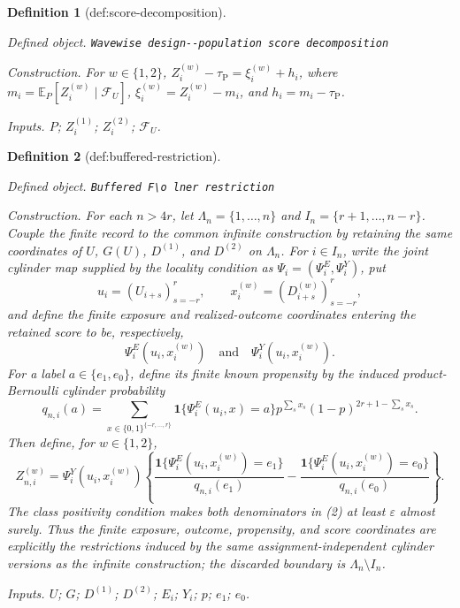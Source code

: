 \documentclass{article}
\newtheorem{definition}{Definition}
\begin{document}
\begin{definition}[def:score-decomposition]\label{def:score-decomposition}
\par\smallskip\noindent\emph{Defined object.} \texttt{Wavewise design-\allowbreak{}-\allowbreak{}population score decomposition}
\par\smallskip\noindent\emph{Construction.} For \(w\in\{1,2\}\), \(Z_i^{(w)}-\tau_{\mathrm P}=\xi_i^{(w)}+h_i\), where \(m_i=\mathbb E_P[Z_i^{(w)}\mid\mathcal F_U]\), \(\xi_i^{(w)}=Z_i^{(w)}-m_i\), and \(h_i=m_i-\tau_{\mathrm P}\).
\par\smallskip\noindent\emph{Inputs.} \(P\); \(Z_i^{(1)}\); \(Z_i^{(2)}\); \(\mathcal F_U\).
\end{definition}

\begin{definition}[def:buffered-restriction]\label{def:buffered-restriction}
\par\smallskip\noindent\emph{Defined object.} \texttt{Buffered F\textbackslash{}\allowbreak{}o lner restriction}
\par\smallskip\noindent\emph{Construction.} For each \(n>4r\), let \(\Lambda_n=\{1,\ldots,n\}\) and \(I_n=\{r+1,\ldots,n-r\}\).  Couple the finite record to the common infinite construction by retaining the same coordinates of \(U\), \(G(U)\), \(D^{(1)}\), and \(D^{(2)}\) on \(\Lambda_n\).  For \(i\in I_n\), write the joint cylinder map supplied by the locality condition as \(\Psi_i=(\Psi_i^E,\Psi_i^Y)\), put
\[
 u_i=(U_{i+s})_{s=-r}^{r},
 \qquad
 x_i^{(w)}=(D_{i+s}^{(w)})_{s=-r}^{r},
\]
and define the finite exposure and realized-outcome coordinates entering the retained score to be, respectively,
\[
 \Psi_i^E(u_i,x_i^{(w)})
 \quad\text{and}\quad
 \Psi_i^Y(u_i,x_i^{(w)}).
\]
For a label \(a\in\{e_1,e_0\}\), define its finite known propensity by the induced product-Bernoulli cylinder probability
\[
 q_{n,i}(a)
 =\sum_{x\in\{0,1\}^{\{-r,\ldots,r\}}}
 \mathbf 1\{\Psi_i^E(u_i,x)=a\}
 p^{\sum_sx_s}(1-p)^{2r+1-\sum_sx_s}. \tag{1}
\]
Then define, for \(w\in\{1,2\}\),
\[
 Z_{n,i}^{(w)}
 =\Psi_i^Y(u_i,x_i^{(w)})
 \left\{
  \frac{\mathbf 1\{\Psi_i^E(u_i,x_i^{(w)})=e_1\}}{q_{n,i}(e_1)}
  -\frac{\mathbf 1\{\Psi_i^E(u_i,x_i^{(w)})=e_0\}}{q_{n,i}(e_0)}
 \right\}. \tag{2}
\]
The class positivity condition makes both denominators in (2) at least \(\varepsilon\) almost surely.  Thus the finite exposure, outcome, propensity, and score coordinates are explicitly the restrictions induced by the same assignment-independent cylinder versions as the infinite construction; the discarded boundary is \(\Lambda_n\setminus I_n\).
\par\smallskip\noindent\emph{Inputs.} \(U\); \(G\); \(D^{(1)}\); \(D^{(2)}\); \(E_i\); \(Y_i\); \(p\); \(e_1\); \(e_0\).
\end{definition}
\end{document}
